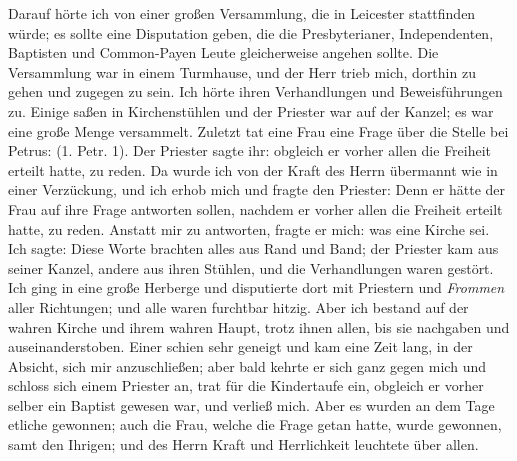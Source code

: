 Darauf hörte ich von einer großen Versammlung, die in
Leicester stattfinden würde; es sollte eine Disputation 
geben, die die Presbyterianer, 
Independenten, Baptisten 
und Common-Payen
Leute gleicherweise angehen sollte. Die Versammlung war in einem
Turmhause, und der Herr trieb mich, dorthin zu gehen und
zugegen zu sein. Ich hörte ihren Verhandlungen und 
Beweisführungen zu. Einige saßen in Kirchenstühlen und der Priester
war auf der Kanzel; es war eine große Menge versammelt.
Zuletzt tat eine Frau eine Frage über die Stelle bei Petrus:
(1. Petr. 1). Der Priester sagte ihr:
 obgleich er
vorher allen die Freiheit erteilt hatte, zu reden. Da wurde ich
von der Kraft des Herrn  übermannt wie in einer Verzückung,
und ich erhob mich und fragte den Priester:  Denn er 
hätte der Frau auf ihre
Frage antworten sollen, nachdem er vorher allen die Freiheit
erteilt hatte, zu reden. Anstatt mir zu antworten, fragte er mich:
was eine Kirche sei. Ich sagte: 
Diese Worte brachten alles aus Rand und Band; der Priester
kam aus seiner Kanzel, andere aus ihren Stühlen, und die 
Verhandlungen waren gestört. Ich ging in eine große Herberge und
disputierte dort mit Priestern und \textit{Frommen} aller Richtungen;
und alle waren furchtbar hitzig. 
Aber ich bestand auf der wahren
Kirche und ihrem wahren Haupt, trotz ihnen allen, bis sie 
nachgaben und auseinanderstoben. Einer schien sehr geneigt und kam
eine Zeit lang, in der Absicht, sich mir anzuschließen; aber bald
kehrte er sich ganz gegen mich und schloss sich einem Priester an,
trat für die Kindertaufe ein, obgleich er vorher selber ein
Baptist gewesen war, und verließ mich. Aber es wurden an dem
Tage etliche gewonnen; auch die Frau, welche die Frage getan
hatte, wurde gewonnen, samt den Ihrigen; und des Herrn  Kraft
und Herrlichkeit leuchtete über allen.


